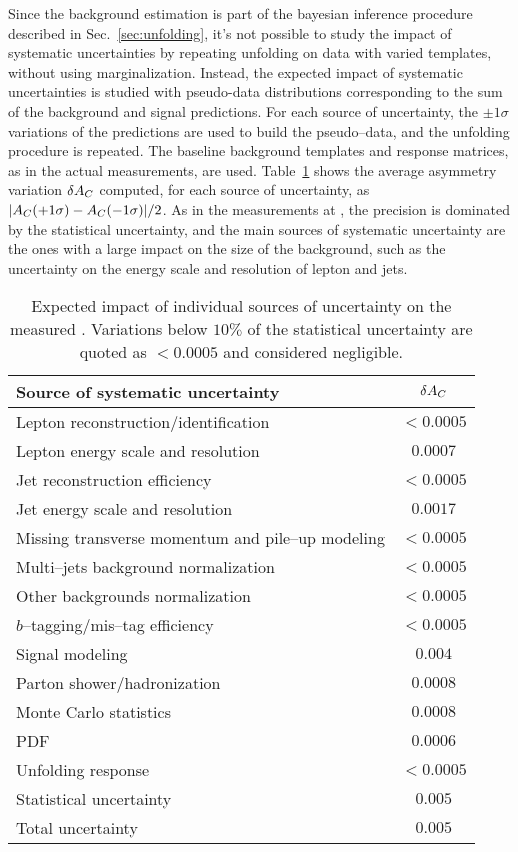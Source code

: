 Since the background estimation is part of the bayesian inference
procedure described in Sec.~\ref{sec:unfolding}, it's not possible to
study the impact of systematic uncertainties by repeating unfolding on data with
varied templates, without using marginalization. Instead, the expected
impact of systematic uncertainties is studied with pseudo-data distributions
corresponding to the sum of the background and signal predictions.
For each source of uncertainty, the $\pm{}1\sigma$ variations of the
predictions are used to build the pseudo--data, and the unfolding
procedure is repeated. The baseline background templates and response
matrices, as in the actual measurements, are used.
Table~\ref{tab:8tevsystematics} shows the average asymmetry variation
$\delta{\ensuremath{A_C}{}}$ computed, for each source of uncertainty, as
$|A_C{}(+1\sigma)-A_C{}(-1\sigma)|/2$.
As in the measurements at \seventev{}, the precision is dominated by
the statistical uncertainty, and the main sources of systematic
uncertainty are the ones with a large impact on the size of the
\wjets{} background, such as the uncertainty on the energy scale and
resolution of lepton and jets. 

\begin{table}[!htb]\centering
\begin{tabular}{l c}
\toprule
Source of systematic uncertainty  & $\delta{\ensuremath{A_C}{}}$ \\
\midrule
Lepton reconstruction/identification    & $<0.0005$\\
Lepton energy scale and resolution      &  $0.0007$\\
Jet reconstruction efficiency                 &  $<0.0005$ \\
Jet energy scale and resolution             &  $0.0017$ \\
Missing transverse momentum and pile--up modeling& $<0.0005$\\
Multi--jets background normalization & $<0.0005$\\
Other backgrounds normalization        & $<0.0005$\\
$b$--tagging/mis--tag efficiency       & $<0.0005$\\
Signal modeling                                    & $0.004$\\
Parton shower/hadronization                & $0.0008$\\
Monte Carlo statistics                            & $0.0008$\\
PDF                                                        &$0.0006$\\
Unfolding response                               &$<0.0005$\\
\midrule
Statistical uncertainty                           & $0.005$ \\
\midrule
Total uncertainty                                   & $0.005$ \\
\bottomrule
\end{tabular}
\caption{Expected impact of individual sources of uncertainty on the
  measured \ac{}. Variations below $10\%$ of the
  statistical uncertainty are quoted as $<0.0005$ and considered negligible.}
\label{tab:8tevsystematics}
\end{table}

